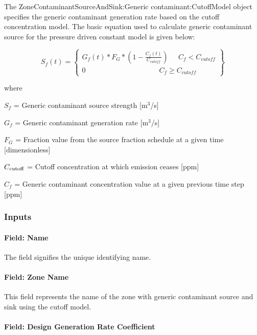 The Zone\-Contaminant\-Source\-And\-Sink:\-Generic contaminant:CutoffModel object specifies the generic contaminant generation rate based on the cutoff concentration model. The basic equation used to calculate generic contaminant source for the pressure driven constant model is given below:

\begin{equation}
{S_f}(t) = \left\{ \begin{array}{l}{G_f}(t)*{F_G}*\left( {1 - \frac{{{C_f}(t)}}{{{C_{cutoff}}}}} \right)\;\;\;\;\;{C_f} < {C_{cutoff}}\\0\;\;\;\;\;\;\;\;\;\;\;\;\;\;\;\;\;\;\;\;\;\;\;\;\;\;\;\;\;\;\;\;\;\;\;\;\;{C_f} \ge {C_{cutoff}}\end{array} \right\}
\end{equation}

where

\(S_{f}\) = Generic contaminant source strength {[}m\(^{3}\)/s{]}

\(G_{f}\) = Generic contaminant generation rate {[}m\(^{3}\)/s{]}

\(F_{G}\) = Fraction value from the source fraction schedule at a given time {[}dimensionless{]}

\(C_{\rm{cutoff}}\) = Cutoff concentration at which emission ceases {[}ppm{]}

\(C_{f}\) = Generic contaminant concentration value at a given previous time step {[}ppm{]}

\subsubsection{Inputs}\label{inputs-13-006}

\paragraph{Field: Name}\label{field-name-13-005}

The field signifies the unique identifying name.

\paragraph{Field: Zone Name}\label{field-zone-name-4-002}

This field represents the name of the zone with generic contaminant source and sink using the cutoff model.

\paragraph{Field: Design Generation Rate Coefficient}\label{field-design-generation-rate-coefficient-1}

